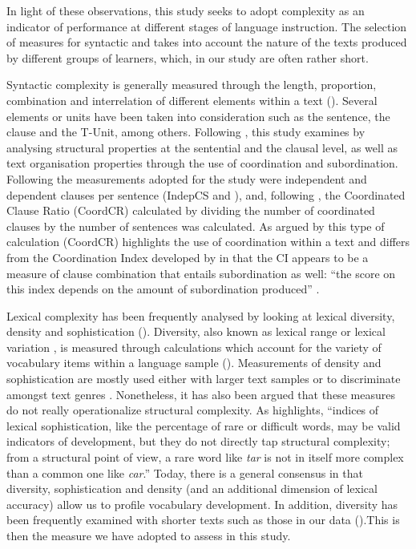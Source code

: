 \documentclass[output=paper]{langsci/langscibook}
\begin{document}
In light of these observations, this study seeks to adopt complexity as an indicator of  performance at different stages of language instruction. The selection of measures for syntactic and  takes into account the nature of  the texts produced by different groups of learners, which, in our study are often rather short.

\largerpage
Syntactic complexity is generally measured through the length, proportion, combination and interrelation of  different elements within a text (\citealt{BultéHousen2014}). Several elements or units have been taken into consideration such as the sentence, the clause and the T-Unit, among others.  Following \citet{Pallotti2015}, this study examines   by analysing structural properties at the sentential and the clausal level, as well as text organisation properties through the use of coordination and subordination. Following \citet{TorrasEtAl2006} the measurements adopted for the study were independent and dependent clauses per sentence (IndepCS and ), and, following \citet{BultéHousen2014}, the Coordinated Clause Ratio (CoordCR) calculated by dividing the number of coordinated clauses by the number of sentences was calculated. As argued by  \citet{BultéHousen2012,BultéHousen2014} this type of calculation (CoordCR) highlights the use of coordination within a text and differs from the Coordination Index developed by \citet{Bardovi-Harlig1992} in that the CI appears to be a measure of clause combination that entails subordination as well: “the score on this index depends on the amount of subordination produced” \citep[38]{BultéHousen2012}.


Lexical complexity has been frequently analysed by looking at lexical diversity, density and sophistication (\citealt{HousenEtAl2012,BultéHousen2014}). Diversity, also known as lexical range \citep{Crystal1982} or lexical variation \citep{Read2000}, is measured through calculations which account for the variety of vocabulary items within a language sample (\citealt{MalvernEtAl2004}). Measurements of density and sophistication are mostly used either with larger text samples or to discriminate amongst text genres \citep{Read2000}. Nonetheless, it has also been argued that these measures do not really operationalize structural complexity. As \citet[126]{Pallotti2015} highlights, “indices of lexical sophistication, like the percentage of rare or difficult words, may be valid indicators of development, but they do not directly tap structural complexity; from a structural point of view, a rare word like \textit{tar} is not in itself more complex than a common one like \textit{car}.” Today, there is a general consensus in that diversity, sophistication and density (and an additional dimension of lexical accuracy) allow us to profile vocabulary development. In addition, diversity has been frequently examined with shorter texts such as those in our data (\citealt{MearaMiralpeix2017}).This is then the measure we have adopted to assess  in this study.
\end{document}
